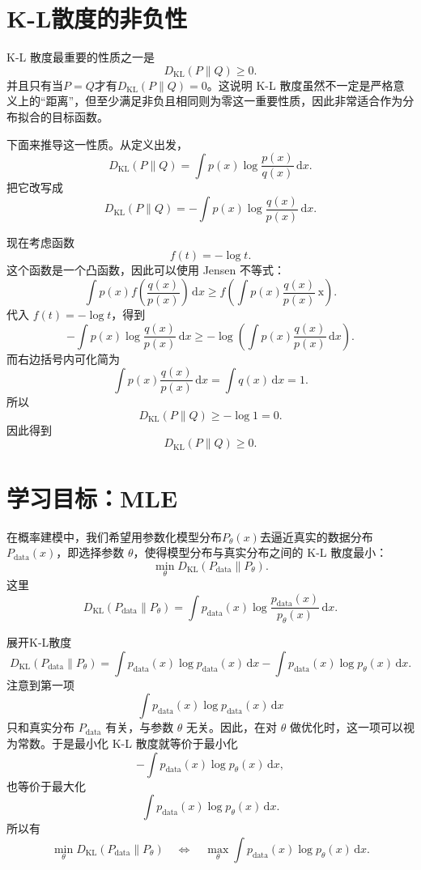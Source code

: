 \section{K-L散度的非负性}

K-L 散度最重要的性质之一是
\[
D_{\mathrm{KL}}(P\|Q)\ge 0.
\]
并且只有当\(P=Q\)才有\(D_{\mathrm{KL}}(P\|Q)=0\)。这说明 K-L 散度虽然不一定是严格意义上的``距离''，但至少满足非负且相同则为零这一重要性质，因此非常适合作为分布拟合的目标函数。

下面来推导这一性质。从定义出发，
\[
D_{\mathrm{KL}}(P\|Q)=\int p(x)\log\frac{p(x)}{q(x)}\,\mathrm{d}x.
\]
把它改写成
\[
D_{\mathrm{KL}}(P\|Q)=-\int p(x)\log\frac{q(x)}{p(x)}\,\mathrm{d}x.
\]

现在考虑函数
\[
f(t)=-\log t.
\]
这个函数是一个凸函数，因此可以使用 Jensen 不等式：
\[
\int p(x)f\left(\frac{q(x)}{p(x)}\right)\,\mathrm{d}x
\ge
f\left(\int p(x)\frac{q(x)}{p(x)}\,\mathrm{x}\right).
\]
代入 \(f(t)=-\log t\)，得到
\[
-\int p(x)\log\frac{q(x)}{p(x)}\,\mathrm{d}x
\ge
-\log\left(\int p(x)\frac{q(x)}{p(x)}\,\mathrm{d}x\right).
\]
而右边括号内可化简为
\[
\int p(x)\frac{q(x)}{p(x)}\,\mathrm{d}x
=
\int q(x)\,\mathrm{d}x
=1.
\]
所以
\[
D_{\mathrm{KL}}(P\|Q)\ge -\log 1=0.
\]
因此得到
\[
D_{\mathrm{KL}}(P\|Q)\ge 0.
\]

\section{学习目标：MLE}

在概率建模中，我们希望用参数化模型分布\(P_\theta(x)\)去逼近真实的数据分布\(P_{\mathrm{data}}(x)\)，即选择参数 \(\theta\)，使得模型分布与真实分布之间的 K-L 散度最小：
\[
\min_\theta D_{\mathrm{KL}}(P_{\mathrm{data}}\|P_\theta).
\]
这里
\[
D_{\mathrm{KL}}(P_{\mathrm{data}}\|P_\theta)
=
\int p_{\mathrm{data}}(x)\log\frac{p_{\mathrm{data}}(x)}{p_\theta(x)}\,\mathrm{d}x.
\]

展开K-L散度
\[
D_{\mathrm{KL}}(P_{\mathrm{data}}\|P_\theta)
=
\int p_{\mathrm{data}}(x)\log p_{\mathrm{data}}(x)\,\mathrm{d}x
-
\int p_{\mathrm{data}}(x)\log p_\theta(x)\,\mathrm{d}x.
\]
注意到第一项
\[
\int p_{\mathrm{data}}(x)\log p_{\mathrm{data}}(x)\,\mathrm{d}x
\]
只和真实分布 \(P_{\mathrm{data}}\) 有关，与参数 \(\theta\) 无关。因此，在对 \(\theta\) 做优化时，这一项可以视为常数。于是最小化 K-L 散度就等价于最小化
\[
-\int p_{\mathrm{data}}(x)\log p_\theta(x)\,\mathrm{d}x,
\]
也等价于最大化
\[
\int p_{\mathrm{data}}(x)\log p_\theta(x)\,\mathrm{d}x.
\]
所以有
\[
\min_\theta D_{\mathrm{KL}}(P_{\mathrm{data}}\|P_\theta)
\quad\Longleftrightarrow\quad
\max_\theta \int p_{\mathrm{data}}(x)\log p_\theta(x)\,\mathrm{d}x.
\]

